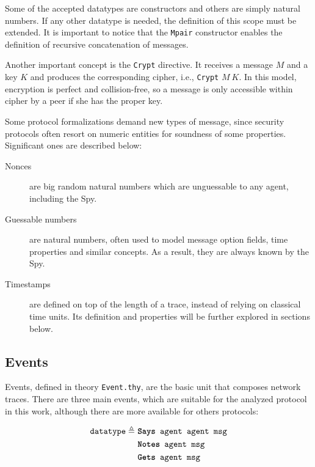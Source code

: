 Some of the accepted datatypes are constructors and others are simply natural numbers. If any other datatype is needed, the definition of this scope must be extended. It is important to notice that the \texttt{Mpair} constructor enables the definition of recursive concatenation of messages.

Another important concept is the \texttt{Crypt} directive. It receives a message $M$ and a key $K$ and produces the corresponding cipher, i.e., \texttt{Crypt} $M\ K$. In this model, encryption is perfect and collision-free, so a message is only accessible within cipher by a peer if she has the proper key.

Some protocol formalizations demand new types of message, since security protocols often resort on numeric entities for soundness of some properties. Significant ones are described below:

\begin{description}
  \item[Nonces] are big random natural numbers which are unguessable to any agent, including the Spy.

  \item[Guessable numbers] are natural numbers, often used to model message option fields, time properties and similar concepts. As a result, they are always known by the Spy.

  \item[Timestamps] are defined on top of the length of a trace, instead of relying on classical time units. Its definition and properties will be further explored in sections below.
\end{description}



\subsection{Events}
Events, defined in theory \texttt{Event.thy}, are the basic unit that composes network traces. There are three main events, which are suitable for the analyzed protocol in this work, although there are more available for others protocols:

\begin{equation*}
  \begin{split}
    \texttt{datatype} \triangleq\
    & \texttt{\textbf{Says} agent agent msg} \\
    & \texttt{\textbf{Notes} agent msg} \\
    & \texttt{\textbf{Gets} agent msg}
  \end{split}
\end{equation*}

